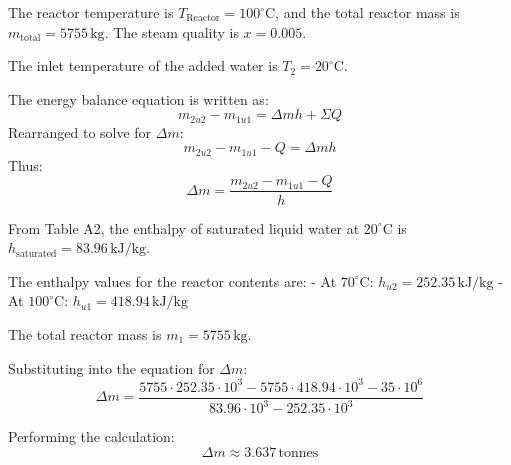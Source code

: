 The reactor temperature is \( T_{\text{Reactor}} = 100^\circ\text{C} \), and the total reactor mass is \( m_{\text{total}} = 5755 \, \text{kg} \). The steam quality is \( x = 0.005 \).  

The inlet temperature of the added water is \( T_2 = 20^\circ\text{C} \).  

The energy balance equation is written as:  
\[
m_{2u2} - m_{1u1} = \Delta m h + \Sigma Q
\]  
Rearranged to solve for \( \Delta m \):  
\[
m_{2u2} - m_{1u1} - Q = \Delta m h
\]  
Thus:  
\[
\Delta m = \frac{m_{2u2} - m_{1u1} - Q}{h}
\]  

From Table A2, the enthalpy of saturated liquid water at \( 20^\circ\text{C} \) is \( h_{\text{saturated}} = 83.96 \, \text{kJ/kg} \).  

The enthalpy values for the reactor contents are:  
- At \( 70^\circ\text{C} \): \( h_{u2} = 252.35 \, \text{kJ/kg} \)  
- At \( 100^\circ\text{C} \): \( h_{u1} = 418.94 \, \text{kJ/kg} \)  

The total reactor mass is \( m_1 = 5755 \, \text{kg} \).  

Substituting into the equation for \( \Delta m \):  
\[
\Delta m = \frac{5755 \cdot 252.35 \cdot 10^3 - 5755 \cdot 418.94 \cdot 10^3 - 35 \cdot 10^6}{83.96 \cdot 10^3 - 252.35 \cdot 10^3}
\]  

Performing the calculation:  
\[
\Delta m \approx 3.637 \, \text{tonnes}
\]